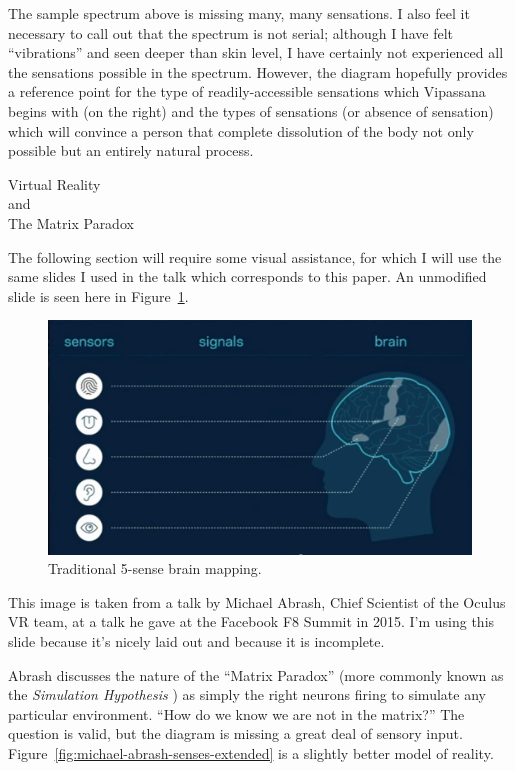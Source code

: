 \documentclass{article}
\begin{document}
The sample spectrum above is missing many, many sensations. I also feel it necessary to call out that the spectrum is not serial; although I have felt ``vibrations'' and seen deeper than skin level, I have certainly not experienced all the sensations possible in the spectrum. However, the diagram hopefully provides a reference point for the type of readily-accessible sensations which Vipassana begins with (on the right) and the types of sensations (or absence of sensation) which will convince a person that complete dissolution of the body not only possible but an entirely natural process.


\pagebreak

\begin{center}
  \Huge{Virtual Reality}\\
  \Huge{and}\\
  \Huge{The Matrix Paradox}
\end{center}

The following section will require some visual assistance, for which I will use the same slides I used in the talk which corresponds to this paper. An unmodified slide is seen here in Figure~\ref{fig:michael-abrash-senses}.

\begin{figure}[h]
  \centering
  \includegraphics[width=\linewidth]{images/michael-abrash-senses.png}
  \caption{Traditional 5-sense brain mapping.}
  \label{fig:michael-abrash-senses}
\end{figure}

This image is taken from a talk by Michael Abrash, Chief Scientist of the Oculus VR team, at a talk he gave at the Facebook F8 Summit in 2015. \cite{abrashvr} I'm using this slide because it's nicely laid out and because it is incomplete.

Abrash discusses the nature of the ``Matrix Paradox'' (more commonly known as the \textit{Simulation Hypothesis} \cite{simulationhypothesis}) as simply the right neurons firing to simulate any particular environment. ``How do we know we are not in the matrix?'' The question is valid, but the diagram is missing a great deal of sensory input. Figure~\ref{fig:michael-abrash-senses-extended} is a slightly better model of reality.
\end{document}
